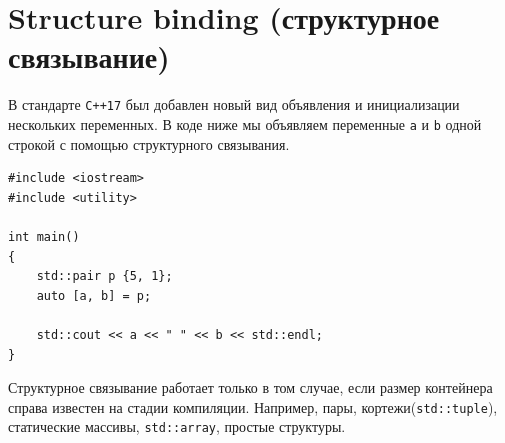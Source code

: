 \documentclass{article}
\begin{document}
\section*{Structure binding (структурное связывание)}
В стандарте \texttt{C++17} был добавлен новый вид объявления и инициализации нескольких переменных. В коде ниже мы объявляем переменные \texttt{a} и \texttt{b} одной строкой с помощью структурного связывания.
\begin{lstlisting}
#include <iostream>
#include <utility>

int main() 
{
    std::pair p {5, 1};
    auto [a, b] = p;
    
    std::cout << a << " " << b << std::endl;
}
\end{lstlisting}
Структурное связывание работает только в том случае, если размер контейнера справа известен на стадии компиляции. Например, пары, кортежи(\texttt{std::tuple}), статические массивы, \texttt{std::array}, простые структуры.
\end{document}
